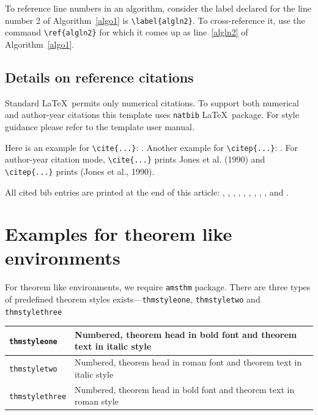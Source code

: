 \documentclass[lineno,pdflatex,sn-nature]{sn-jnl}%
\begin{document}
To reference line numbers in an algorithm, consider the label declared for the line number 2 of Algorithm~\ref{algo1} is \verb+\label{algln2}+. To cross-reference it, use the command \verb+\ref{algln2}+ for which it comes up as line~\ref{algln2} of Algorithm~\ref{algo1}.

\subsection{Details on reference citations}\label{subsec7}

Standard \LaTeX\ permits only numerical citations. To support both numerical and author-year citations this template uses \verb+natbib+ \LaTeX\ package. For style guidance please refer to the template user manual.

Here is an example for \verb+\cite{...}+: \cite{bib1}. Another example for \verb+\citep{...}+: \citep{bib2}. For author-year citation mode, \verb+\cite{...}+ prints Jones et al. (1990) and \verb+\citep{...}+ prints (Jones et al., 1990).

All cited bib entries are printed at the end of this article: \cite{bib3}, \cite{bib4}, \cite{bib5}, \cite{bib6}, \cite{bib7}, \cite{bib8}, \cite{bib9}, \cite{bib10}, \cite{bib11}, \cite{bib12} and \cite{bib13}.

\section{Examples for theorem like environments}\label{sec10}

For theorem like environments, we require \verb+amsthm+ package. There are three types of predefined theorem styles exists---\verb+thmstyleone+, \verb+thmstyletwo+ and \verb+thmstylethree+ 

\bigskip
\begin{tabular}{|l|p{19pc}|}
\hline
\verb+thmstyleone+ & Numbered, theorem head in bold font and theorem text in italic style \\\hline
\verb+thmstyletwo+ & Numbered, theorem head in roman font and theorem text in italic style \\\hline
\verb+thmstylethree+ & Numbered, theorem head in bold font and theorem text in roman style \\\hline
\end{tabular}
\bigskip
\end{document}
